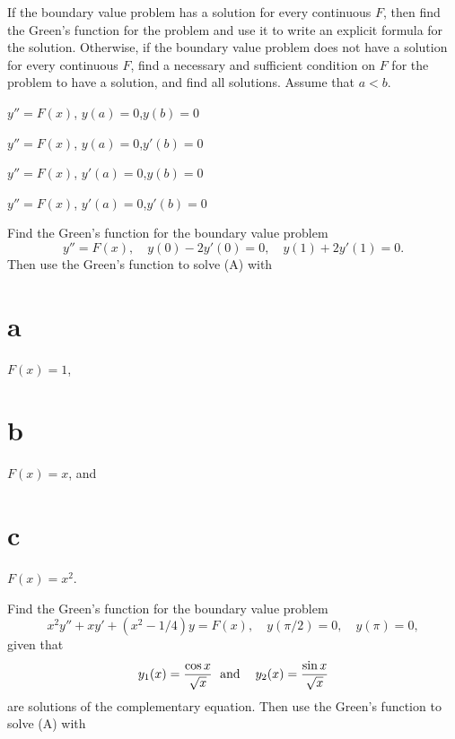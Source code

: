\begin{exerciselist}
  \item\label{exer:13.1.21} If the boundary value problem has a solution for every continuous $F$,
        then find the Green's function for the problem and use it to write an explicit formula for
        the solution. Otherwise, if the boundary value problem does not have a solution for every
        continuous $F$, find a necessary and sufficient condition on $F$ for the problem to have a
        solution, and find all solutions. Assume that $a<b$.

  \begin{alist}
    \item %
    $y''=F(x)$, \quad $y(a)=0$,\quad $y(b)=0$

    \item %
    $y''=F(x)$, \quad $y(a)=0$,\quad $y'(b)=0$

    \item %
    $y''=F(x)$, \quad $y'(a)=0$,\quad $y(b)=0$

    \item %
    $y''=F(x)$, \quad $y'(a)=0$,\quad $y'(b)=0$
  \end{alist}

  \item\label{exer:13.1.22} Find the Green's function for the boundary value problem
  \begin{equation}
    y''=F(x),\quad y(0)-2y'(0)=0,\quad y(1)+2y'(1)=0.\tag{A}
  \end{equation}
  Then use the Green's function to solve (A) with \part{a} $F(x)=1$, \part{b} $F(x)=x$, and \part{c}
  $F(x)=x^{2}$.

  \item\label{exer:13.1.23} Find the Green's function for the boundary value problem
  \begin{equation}
    x^{2}y''+xy'+(x^{2}-1/4)y=F(x),\quad y(\pi/2)=0,\quad y(\pi)=0,\tag{A}
  \end{equation}
  given that
  \[
    y_{1}(x)=\frac{\cos x}{\sqrt{x}}\text{\; and\; \; }y_{2}(x)=\frac{\sin x}{\sqrt{x}}
  \]
  are solutions of the complementary equation. Then use the Green's function to solve (A) with

\end{exerciselist}
